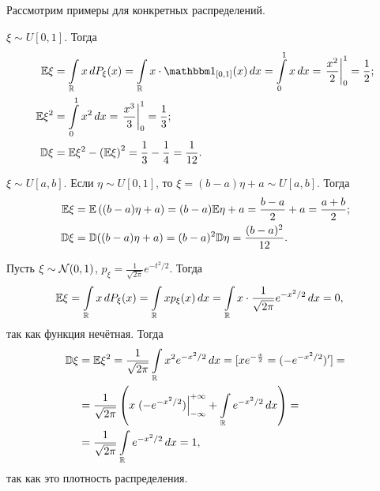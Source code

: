 \documentclass[../main.tex]{subfiles}
\begin{document}
Рассмотрим примеры для конкретных распределений.

\begin{exmpl}
 $ \xi \sim U[0,1] $. Тогда
 \begin{align*}
  \E\xi &= \int\limits_{\R} x\,dP_\xi(x)  = \int\limits_{\R} x \cdot \Ind_{[0,1]}  (x)\,dx= \int\limits_{0}^{1} x\,dx = \left. \frac{x^{2}}{2} \right|_0^{1} = \frac{1}{2}; \\
   \E\xi^{2} &= \int\limits_{0}^{1} x^{2}\,dx = \left. \frac{x^{3}}{3}\right|_0^{1} = \frac{1}{3}; \\
    \D\xi &= \E\xi^{2} - \left( \E\xi \right)^{2} = \frac{1}{3} - \frac{1}{4} = \frac{1}{12}.
 \end{align*} 
\end{exmpl}
\begin{exmpl}
 $ \xi \sim U[a,b] $. Если $ \eta \sim U[0,1] $, то $ \xi = (b-a)\eta + a\sim U[a,b] $. Тогда
 \begin{align*}
  \mathbb E\xi &= \mathbb E \left( (b-a)\eta + a \right) = (b-a)\mathbb E\eta + a = \frac{b-a}{2} + a = \frac{a+b}{2}; \\
  \mathbb D\xi &= \mathbb D((b-a)\eta + a) = (b-a)^{2}\mathbb D\eta = \frac{(b-a)^{2}}{12}.
 \end{align*} 
\end{exmpl}

\begin{exmpl}
 Пусть $ \xi \sim \mathcal N(0,1) $,  $ p_\xi = \frac{1}{\sqrt{2\pi}}e^{-t^{2} / 2} $. Тогда
 \begin{align*}
  \mathbb E\xi &= \int\limits_{\mathbb{R}} x\,dP_\xi(x) = \int\limits_{\mathbb{R}} x p_\xi(x)\,dx = \int\limits_{\mathbb{R}} x \cdot \frac{1}{\sqrt{2\pi}}      e^{-x^{2} / 2}\,dx = 0,
 \end{align*} так как функция нечётная. Тогда
 \begin{align*}
  \mathbb D\xi &= \mathbb E\xi^{2} = \frac{1}{\sqrt{2\pi}}\int\limits_{\mathbb{R}} x^{2} e^{-x^{2} / 2}\,dx = [xe^{-\frac{x}{2}} = (-e^{-x^{2} / 2})'] = \\
  &= \frac{1}{\sqrt{2\pi}} \left( x \left.(-e^{-x^{2} / 2})\right|_{-\infty}^{+\infty} + \int\limits_{\mathbb{R}} e^{-x^{2} / 2}\,dx  \right) = \\
   &= \frac{1}{\sqrt{2\pi}} \int\limits_{\mathbb{R}} e^{-x^{2} / 2} \,dx = 1,
 \end{align*} так как это плотность распределения.
\end{exmpl}
 
\end{document}

